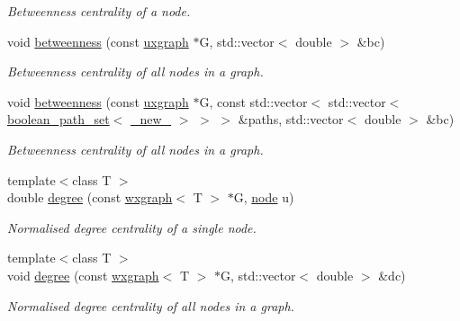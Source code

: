 \begin{DoxyCompactItemize}
\begin{DoxyCompactList}\small\item\em Betweenness centrality of a node. \end{DoxyCompactList}\item 
void \hyperlink{namespacelgraph_1_1networks_1_1metrics_1_1centralities_a9bc71e78d93bb18cd0b6d69c7c88da8a}{betweenness} (const \hyperlink{classlgraph_1_1uxgraph}{uxgraph} $\ast$G, std\+::vector$<$ double $>$ \&bc)
\begin{DoxyCompactList}\small\item\em Betweenness centrality of all nodes in a graph. \end{DoxyCompactList}\item 
void \hyperlink{namespacelgraph_1_1networks_1_1metrics_1_1centralities_ae8016a7511fd3982f986670283cc048c}{betweenness} (const \hyperlink{classlgraph_1_1uxgraph}{uxgraph} $\ast$G, const std\+::vector$<$ std\+::vector$<$ \hyperlink{namespacelgraph_afad432931ba600ab1628d5c9595986c5}{boolean\+\_\+path\+\_\+set}$<$ \hyperlink{namespacelgraph_aa930092705699c3af78e3a4de7880a3f}{\+\_\+new\+\_\+} $>$ $>$ $>$ \&paths, std\+::vector$<$ double $>$ \&bc)
\begin{DoxyCompactList}\small\item\em Betweenness centrality of all nodes in a graph. \end{DoxyCompactList}\item 
{\footnotesize template$<$class T $>$ }\\double \hyperlink{namespacelgraph_1_1networks_1_1metrics_1_1centralities_ab069253de07dc54020e9d6cc1a27a6c8}{degree} (const \hyperlink{classlgraph_1_1wxgraph}{wxgraph}$<$ T $>$ $\ast$G, \hyperlink{namespacelgraph_a397169dd66adf725210a30fb7251773e}{node} u)
\begin{DoxyCompactList}\small\item\em Normalised degree centrality of a single node. \end{DoxyCompactList}\item 
{\footnotesize template$<$class T $>$ }\\void \hyperlink{namespacelgraph_1_1networks_1_1metrics_1_1centralities_a20747beaa4dd97bc96cf153afecc464e}{degree} (const \hyperlink{classlgraph_1_1wxgraph}{wxgraph}$<$ T $>$ $\ast$G, std\+::vector$<$ double $>$ \&dc)
\begin{DoxyCompactList}\small\item\em Normalised degree centrality of all nodes in a graph. \end{DoxyCompactList}\item 

\end{DoxyCompactItemize}
